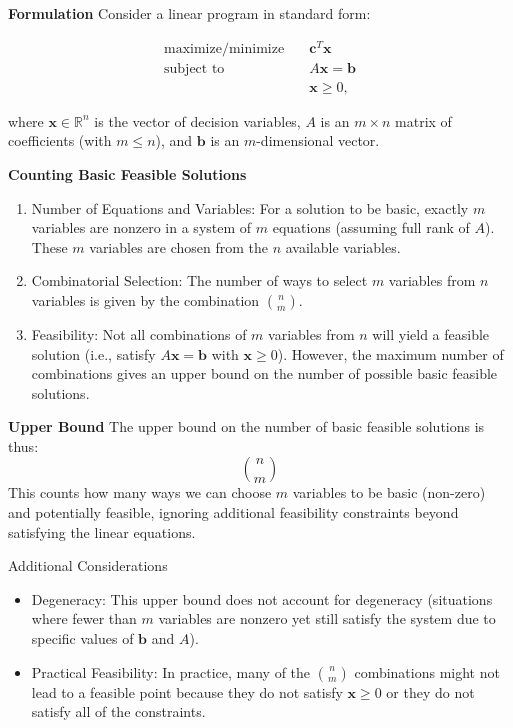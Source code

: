 \documentclass[8pt]{article}
\begin{document}
\textbf{Formulation}
Consider a linear program in standard form:

\begin{align*}
\text{maximize/minimize} \quad & \mathbf{c}^T \mathbf{x} \\
\text{subject to} \quad & A\mathbf{x} = \mathbf{b} \\
& \mathbf{x} \geq 0,
\end{align*}

where \( \mathbf{x} \in \mathbb{R}^n \) is the vector of decision variables, \( A \) is an \( m \times n \) matrix of coefficients (with \( m \leq n \)), and \( \mathbf{b} \) is an \( m \)-dimensional vector.

\textbf{Counting Basic Feasible Solutions}
\begin{enumerate}
    \item Number of Equations and Variables: For a solution to be basic, exactly \( m \) variables are nonzero in a system of \( m \) equations (assuming full rank of \( A \)). These \( m \) variables are chosen from the \( n \) available variables.
    \item Combinatorial Selection: The number of ways to select \( m \) variables from \( n \) variables is given by the combination \( \binom{n}{m} \).
    \item Feasibility: Not all combinations of \( m \) variables from \( n \) will yield a feasible solution (i.e., satisfy \( A\mathbf{x} = \mathbf{b} \) with \( \mathbf{x} \geq 0 \)). However, the maximum number of combinations gives an upper bound on the number of possible basic feasible solutions.
\end{enumerate}

\textbf{Upper Bound}
The upper bound on the number of basic feasible solutions is thus:
\[
\binom{n}{m}
\]
This counts how many ways we can choose \( m \) variables to be basic (non-zero) and potentially feasible, ignoring additional feasibility constraints beyond satisfying the linear equations.

Additional Considerations
\begin{itemize}
    \item Degeneracy: This upper bound does not account for degeneracy (situations where fewer than \( m \) variables are nonzero yet still satisfy the system due to specific values of \( \mathbf{b} \) and \( A \)).
    \item Practical Feasibility: In practice, many of the \( \binom{n}{m} \) combinations might not lead to a feasible point because they do not satisfy \( \mathbf{x} \geq 0 \) or they do not satisfy all of the constraints.
\end{itemize}
\end{document}
